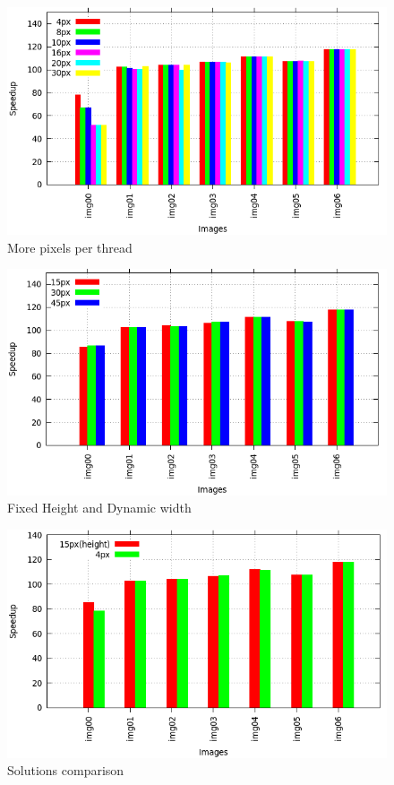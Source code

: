 \documentclass[a4paper]{article}
\begin{document}
\begin{figure}[!ht]
    \centering
    \includegraphics[width=0.7\linewidth]{res/new/smooth_more}
    \caption{More pixels per thread}
    \label{fig:smmo}
\end{figure}
\FloatBarrier

\begin{figure}[!ht]
    \centering
    \includegraphics[width=0.7\linewidth]{res/new/smooth_fixed_more}
    \caption{Fixed Height and Dynamic width}
    \label{fig:smhf}
\end{figure}
\FloatBarrier

\begin{figure}[!ht]
    \centering
    \includegraphics[width=0.7\linewidth]{res/new/smooth_compare}
    \caption{Solutions comparison}
    \label{fig:smco}
\end{figure}
\FloatBarrier
\end{document}
